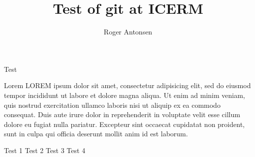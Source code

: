 \documentclass[12pt,a4paper]{article}
\author{Roger Antonsen}
\title{Test of git at ICERM}
\begin{document}
\maketitle

Test

Lorem LOREM ipsum dolor sit amet, consectetur adipisicing elit, sed do eiusmod tempor incididunt ut labore et dolore magna aliqua. Ut enim ad minim veniam, quis nostrud exercitation ullamco laboris nisi ut aliquip ex ea commodo consequat. Duis aute irure dolor in reprehenderit in voluptate velit esse cillum dolore eu fugiat nulla pariatur. Excepteur sint occaecat cupidatat non proident, sunt in culpa qui officia deserunt mollit anim id est laborum.

Test 1
Test 2
Test 3
Test 4
\end{document}

